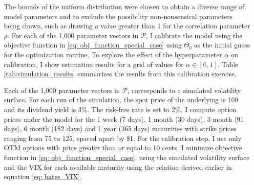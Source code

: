 \documentclass[12pt]{article}
\begin{document}
The bounds of the uniform distribution were chosen to obtain a diverse range of model parameters and to exclude the possibility non-nonsensical parameters being drawn, such as drawing a value greater than 1 for the correlation parameter $\rho$. For each of the 1,000 parameter vectors in $\mathcal{P}$, I calibrate the model using the objective function in \eqref{eq: obj_function_special_case} using $\Theta_0$ as the initial guess for the optimization routine.  To explore the effect of the hyperparameter $\alpha$ on calibration, I show estimation results for a grid of values for $\alpha \in [0,1]$. Table \ref{tab:simulation_results} summarizes the results from this calibration exercise. 

Each of the 1,000 parameter vectors in $\mathcal{P}$, corresponds to a simulated volatility surface. For each run of the simulation, the spot price of the underlying is 100 and its dividend yield is 3\%. The risk-free rate is set to 2\%. I compute option prices under the model for the 1 week (7 days), 1 month (30 days), 3 month (91 days), 6 month (182 days) and 1 year (365 days) maturities with strike prices ranging from 75 to 125, spaced apart by \$1. For the calibration step, I use only OTM options with price greater than or equal to 10 cents. I minimize objective function in \eqref{eq: obj_function_special_case}, using the simulated volatility surface and the VIX for each available maturity using the relation derived earlier in equation \eqref{eq: bates_VIX}. 
\end{document}
